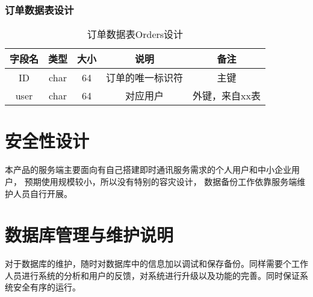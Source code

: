 \subsubsection{订单数据表设计}
\begin{table}[htbp]
\centering
\caption{订单数据表Orders设计} \label{tab:order-database}
\begin{tabular}{|c|c|c|c|c|}
    \hline
    字段名 & 类型 & 大小 & 说明 & 备注 \\
    \hline
    ID & char & 64 & 订单的唯一标识符 & 主键\\
    \hline
    user & char & 64 & 对应用户 & 外键，来自xx表 \\
    \hline
\end{tabular}
\end{table}



\section{安全性设计}
本产品的服务端主要面向有自己搭建即时通讯服务需求的个人用户和中小企业用户，
预期使用规模较小，所以没有特别的容灾设计，
数据备份工作依靠服务端维护人员自行开展。

\section{数据库管理与维护说明}
对于数据库的维护，随时对数据库中的信息加以调试和保存备份。同样需要个工作人员进行系统的分析和用户的反馈，对系统进行升级以及功能的完善。同时保证系统安全有序的运行。